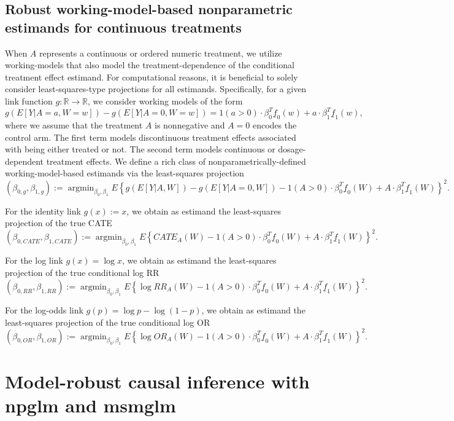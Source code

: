 \documentclass[
]{jss}
\DeclareMathOperator{\argmin}{argmin}
\begin{document}
\subsection{Robust working-model-based nonparametric estimands for continuous treatments}\label{section::estimandNPcont}

When \(A\) represents a continuous or ordered numeric treatment, we
utilize working-models that also model the treatment-dependence of the
conditional treatment effect estimand. For computational reasons, it is
beneficial to solely consider least-squares-type projections for all
estimands. Specifically, for a given link function
\(g:\mathbb{R} \rightarrow \mathbb{R}\), we consider working models of
the form
\[g(E[Y|A=a,W=w]) - g(E[Y|A=0,W=w]) = 1(a>0)\cdot \beta_0^T \underline{f}_0(w) +  a \cdot \beta_1^T \underline{f}_1(w),\]
where we assume that the treatment \(A\) is nonnegative and \(A=0\)
encodes the control arm. The first term models discontinuous treatment
effects associated with being either treated or not. The second term
models continuous or dosage-dependent treatment effects. We define a
rich class of nonparametrically-defined working-model-based estimands
via the least-squares projection
\[(\beta_{0,g}, \beta_{1,g}) := \argmin_{\beta_0, \beta_1} E \left\{ g(E[Y|A,W]) - g(E[Y|A=0,W])  - 1(A>0)\cdot \beta_0^T \underline{f}_0(W) +  A \cdot \beta_1^T \underline{f}_1(W)\right\}^2.\]

For the identity link \(g(x) := x\), we obtain as estimand the
least-squares projection of the true CATE
\[ (\beta_{0,CATE}, \beta_{1,CATE}) := \argmin_{\beta_0, \beta_1} E \left\{ CATE_A(W)  - 1(A>0)\cdot \beta_0^T \underline{f}_0(W) +  A \cdot \beta_1^T \underline{f}_1(W)\right\}^2.\]

For the log link \(g(x) = \log x\), we obtain as estimand the
least-squares projection of the true conditional log RR
\[ (\beta_{0,RR}, \beta_{1,RR}) :=  \argmin_{\beta_0, \beta_1} E \left\{ \log RR_{A}(W)  - 1(A>0)\cdot \beta_0^T \underline{f}_0(W) +  A \cdot \beta_1^T \underline{f}_1(W)\right\}^2.\]

For the log-odds link \(g(p) = \log p - \log (1-p)\), we obtain as
estimand the least-squares projection of the true conditional log OR
\[ (\beta_{0,OR}, \beta_{1,OR}) :=  \argmin_{\beta_0, \beta_1} E \left\{ \log OR_{A}(W)  - 1(A>0)\cdot \beta_0^T \underline{f}_0(W) +  A \cdot \beta_1^T \underline{f}_1(W)\right\}^2.\]

\section{Model-robust causal inference with npglm and msmglm}
\end{document}
